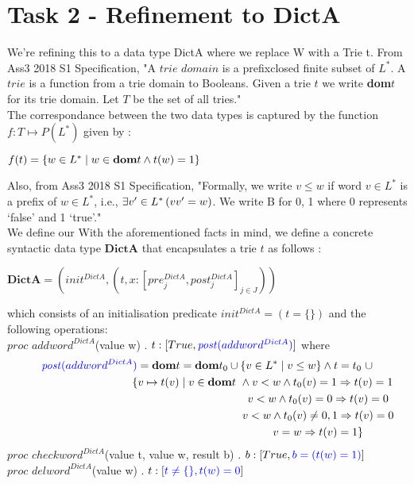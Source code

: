 \documentclass[a4paper,12pt,fleqn]{scrartcl}
\newcommand{\post}{\mathit{post}}
\newcommand{\DictA}{\mathbf{DictA}}
\newcommand{\domt}{\mathbf{dom}t}
\newcommand{\domto}{\mathbf{dom}t_{0}}
\begin{document}
\section{Task 2 - Refinement to DictA}
\label{sec:task-2}
We’re refining this to a data type DictA where we replace W with a Trie t. From Ass3 2018 S1 Specification, "A $trie$ $domain$ is a prefixclosed finite subset of $L^*$. A $trie$ is a function from a trie domain to Booleans. Given a trie $t$ we write \textbf{dom}$t$ for its trie domain. Let $T$ be the set of all tries."\\ 
The correspondance between the two data types is captured by the function $f : T \mapsto P(L^*)$ given by :
\begin{center}$f(t) = \{w\in L^* \mid w \in \textbf{dom}t \wedge t(w)=1\}$\end{center}
Also, from Ass3 2018 S1 Specification, "Formally, we write $v\leq w$ if word $v\in L^*$ is a prefix of $w\in L^*$, i.e., $\exists v'\in L^*\left(vv' = w\right)$. We write B for {0, 1} where 0 represents ‘false’ and 1 ‘true’."\\
We define our 
With the aforementioned facts in mind, we define a concrete syntactic data type $\DictA$ that encapsulates a trie $t$ as follows :
\begin{center}$\DictA = (init^{DictA} , (t,x : [pre_{j}^{DictA}, post_{j}^{DictA}]_{j\in J}))$\end{center}
which consists of an  initialisation predicate \color{blue}$init^{DictA} = (t = \{ \})$ \color{black} and the following operations:\\
$proc$ $addword^{DictA}$(value w) . $t : [True, \color{blue}\post(addword^{DictA})\color{black}]$ where
\begin{gather*}
\color{blue}\post(addword^{DictA})\color{black} = \domt = \domto \cup \{v\in L^* \mid v\leq w\} \And t = t_{0}\text{ }\cup \\
\qquad\qquad\qquad\qquad\qquad \{v\mapsto t(v) \mid v\in\domt\text{ } \And v<w \And t_{0}(v) = 1 \Implies t(v) = 1\\
\qquad\qquad\qquad\qquad\qquad\qquad\qquad\qquad\qquad\qquad v<w \And t_{0}(v) = 0 \Implies t(v) = 0\\
\qquad\qquad\qquad\qquad\qquad\qquad\qquad\qquad\qquad\qquad v<w \And t_{0}(v) \neq 0,1 \Implies t(v) = 0\\
\qquad\qquad\qquad\qquad\qquad\qquad\qquad\qquad\qquad\qquad v=w \Implies t(v) = 1\}
\end{gather*}
$proc$ $checkword^{DictA}$(value t, value w, result b) . $b : [True, \color{blue}b = (t(w) = 1)\color{black}]$\\
$proc$ $delword^{DictA}$(value w) . $t : [\color{blue}t\neq \{ \}, t(w) = 0\color{black}]$\\
\end{document}
